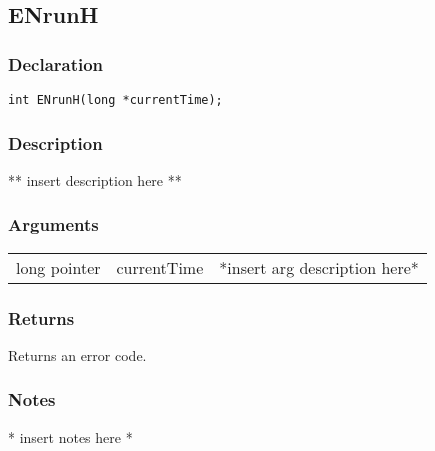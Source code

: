 \subsection{ENrunH}
\subsubsection{Declaration}
\begin{lstlisting}
int ENrunH(long *currentTime);
\end{lstlisting}
\subsubsection{Description}
** insert description here **
\subsubsection{Arguments}
\begin{tabular}{l r p{11cm} }
long pointer&currentTime&*insert arg description here* \\[6pt]
\end{tabular}
\subsubsection{Returns}
Returns an error code.
\subsubsection{Notes}
* insert notes here *